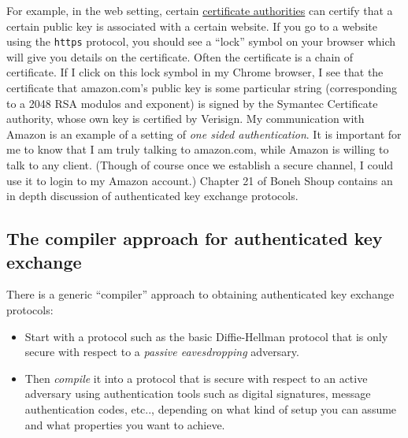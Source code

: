 For example, in the web setting, certain
\href{https://en.wikipedia.org/wiki/Certificate_authority}{certificate
authorities} can certify that a certain public key is associated with a
certain website. If you go to a website using the \texttt{https}
protocol, you should see a ``lock'' symbol on your browser which will
give you details on the certificate. Often the certificate is a chain of
certificate. If I click on this lock symbol in my Chrome browser, I see
that the certificate that amazon.com's public key is some particular
string (corresponding to a 2048 RSA modulos and exponent) is signed by
the Symantec Certificate authority, whose own key is certified by
Verisign. My communication with Amazon is an example of a setting of
\emph{one sided authentication}. It is important for me to know that I
am truly talking to amazon.com, while Amazon is willing to talk to any
client. (Though of course once we establish a secure channel, I could
use it to login to my Amazon account.) Chapter 21 of Boneh Shoup
contains an in depth discussion of authenticated key exchange protocols.


\subsection{The compiler approach for authenticated key
exchange}\label{14-The-compiler-approach-}

There is a generic ``compiler'' approach to obtaining authenticated key
exchange protocols:

\begin{itemize}
\item
  Start with a protocol such as the basic Diffie-Hellman protocol that
  is only secure with respect to a \emph{passive eavesdropping}
  adversary.
\item
  Then \emph{compile} it into a protocol that is secure with respect to
  an active adversary using authentication tools such as digital
  signatures, message authentication codes, etc.., depending on what
  kind of setup you can assume and what properties you want to achieve.
\end{itemize}

